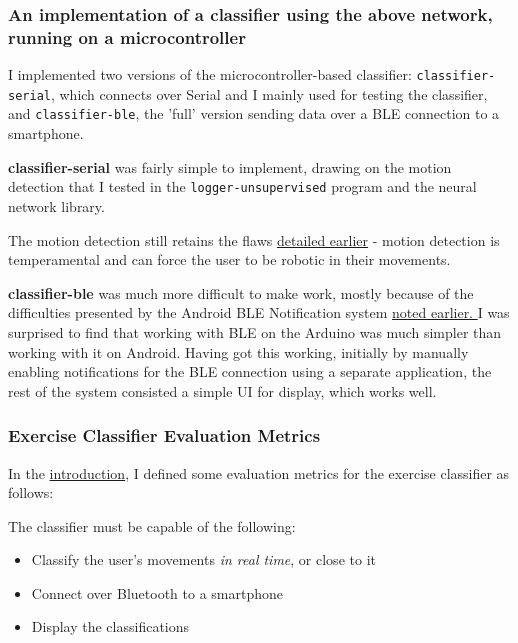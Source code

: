 \documentclass[a4paper]{article}
\begin{document}
\newpage
\subsubsection{An implementation of a classifier using the above network, running on a microcontroller}

I implemented two versions of the microcontroller-based classifier: \lstinline{classifier-serial}, which connects over Serial and I mainly used for testing the classifier, and \lstinline{classifier-ble}, the 'full' version sending data over a BLE connection to a smartphone.

\textbf{classifier-serial} was fairly simple to implement, drawing on the motion detection that I tested in the \lstinline{logger-unsupervised} program and the neural network library.

The motion detection still retains the flaws \hyperref[para:ev_cl_loggerunsupervised]{detailed earlier} - motion detection is temperamental and can force the user to be robotic in their movements.

\label{para:ev_cl_classifierble}
\textbf{classifier-ble} was much more difficult to make work, mostly because of the difficulties presented by the Android BLE Notification system \hyperref[para:ev_cl_loggerble]{noted earlier.
}I was surprised to find that working with BLE on the Arduino was much simpler than working with it on Android. Having got this working, initially by manually enabling notifications for the BLE connection using a separate application, the rest of the system consisted a simple UI for display, which works well. 

\subsubsection{Exercise Classifier Evaluation Metrics}

In the \hyperref[subsubsec:in_cs_ecmetrics]{introduction}, I defined some evaluation metrics for the exercise classifier as follows:

The classifier must be capable of the following:

\begin{itemize}
\item Classify the user's movements \textit{in real time}, or close to it
\item Connect over Bluetooth to a smartphone
\item Display the classifications
\end{itemize}
\end{document}

